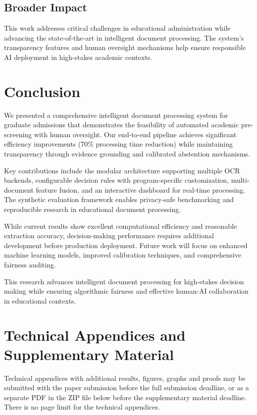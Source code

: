 \documentclass{article}
\begin{document}
\subsection{Broader Impact}

This work addresses critical challenges in educational administration while advancing the state-of-the-art in intelligent document processing. The system's transparency features and human oversight mechanisms help ensure responsible AI deployment in high-stakes academic contexts.

\section{Conclusion}

We presented a comprehensive intelligent document processing system for graduate admissions that demonstrates the feasibility of automated academic pre-screening with human oversight. Our end-to-end pipeline achieves significant efficiency improvements (70\% processing time reduction) while maintaining transparency through evidence grounding and calibrated abstention mechanisms.

Key contributions include the modular architecture supporting multiple OCR backends, configurable decision rules with program-specific customization, multi-document feature fusion, and an interactive dashboard for real-time processing. The synthetic evaluation framework enables privacy-safe benchmarking and reproducible research in educational document processing.

While current results show excellent computational efficiency and reasonable extraction accuracy, decision-making performance requires additional development before production deployment. Future work will focus on enhanced machine learning models, improved calibration techniques, and comprehensive fairness auditing.

This research advances intelligent document processing for high-stakes decision making while ensuring algorithmic fairness and effective human-AI collaboration in educational contexts.




\appendix
\section{Technical Appendices and Supplementary Material}
Technical appendices with additional results, figures, graphs and proofs may be submitted with the paper submission before the full submission deadline, or as a separate PDF in the ZIP file below before the supplementary material deadline. There is no page limit for the technical appendices.
\end{document}
